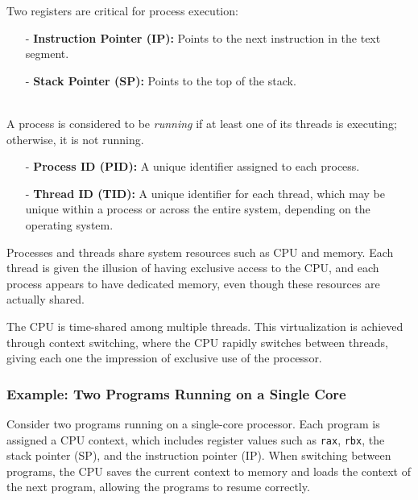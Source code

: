 \begin{definition}
Two registers are critical for process execution:
\begin{itemize}
  \item[-] \textbf{Instruction Pointer (IP):} Points to the next instruction in the text segment.
  \item[-] \textbf{Stack Pointer (SP):} Points to the top of the stack.
\end{itemize}
\end{definition}

\begin{definition}
\leavevmode\\ %
A process is considered to be \emph{running} if at least one of its threads is executing; otherwise, it is not running.
\begin{itemize}
  \item[-] \textbf{Process ID (PID):} A unique identifier assigned to each process.
  \item[-] \textbf{Thread ID (TID):} A unique identifier for each thread, which may be unique within a process or across the entire system, depending on the operating system.
\end{itemize}
\end{definition}

\begin{definition}
Processes and threads share system resources such as CPU and memory. Each thread is given the illusion of having exclusive access to the CPU, and each process appears to have dedicated memory, even though these resources are actually shared.
\end{definition}
\vspace{10px}

\begin{definition}
The CPU is time-shared among multiple threads. This virtualization is achieved through context switching, where the CPU rapidly switches between threads, giving each one the impression of exclusive use of the processor.
\end{definition}

\subsubsection{Example: Two Programs Running on a Single Core}
\begin{example}
Consider two programs running on a single-core processor. Each program is assigned a CPU context, which includes register values such as \texttt{rax}, \texttt{rbx}, the stack pointer (SP), and the instruction pointer (IP). When switching between programs, the CPU saves the current context to memory and loads the context of the next program, allowing the programs to resume correctly.
\end{example}

